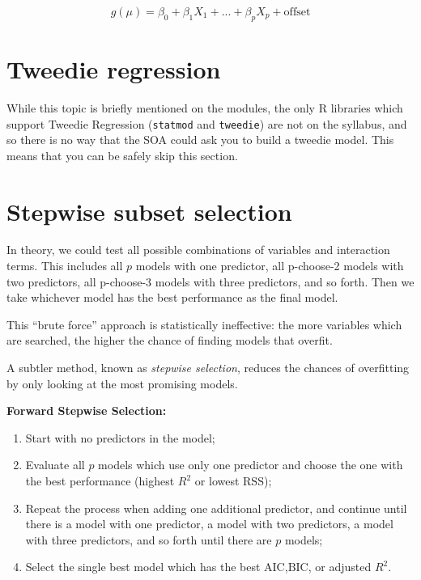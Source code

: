 \documentclass[openany]{book}
\providecommand{\tightlist}{%
  \setlength{\itemsep}{0pt}\setlength{\parskip}{0pt}}
\begin{document}
\[g(\mu) = \beta_0 + \beta_1 X_1 + ... + \beta_p X_p + \text{offset}\]

\hypertarget{tweedie-regression}{%
\section{Tweedie regression}\label{tweedie-regression}}

While this topic is briefly mentioned on the modules, the only R libraries which support Tweedie Regression (\texttt{statmod} and \texttt{tweedie}) are not on the syllabus, and so there is no way that the SOA could ask you to build a tweedie model. This means that you can be safely skip this section.

\hypertarget{stepwise-subset-selection}{%
\section{Stepwise subset selection}\label{stepwise-subset-selection}}

In theory, we could test all possible combinations of variables and interaction terms. This includes all \(p\) models with one predictor, all p-choose-2 models with two predictors, all p-choose-3 models with three predictors, and so forth. Then we take whichever model has the best performance as the final model.

This ``brute force'' approach is statistically ineffective: the more variables which are searched, the higher the chance of finding models that overfit.

A subtler method, known as \emph{stepwise selection}, reduces the chances of overfitting by only looking at the most promising models.

\textbf{Forward Stepwise Selection:}

\begin{enumerate}
\def\labelenumi{\arabic{enumi}.}
\tightlist
\item
  Start with no predictors in the model;
\item
  Evaluate all \(p\) models which use only one predictor and choose the one with the best performance (highest \(R^2\) or lowest \(\text{RSS}\));
\item
  Repeat the process when adding one additional predictor, and continue until there is a model with one predictor, a model with two predictors, a model with three predictors, and so forth until there are \(p\) models;
\item
  Select the single best model which has the best \(\text{AIC}\),\(\text{BIC}\), or adjusted \(R^2\).
\end{enumerate}
\end{document}
